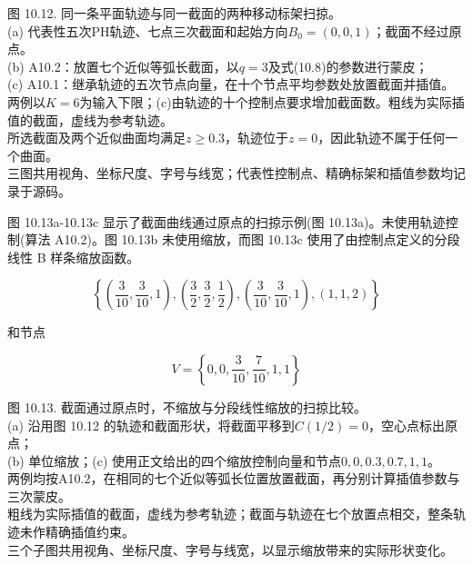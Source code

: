 \documentclass[../main.tex]{subfiles}
\begin{document}
\begin{center}
\begin{minipage}{35cm}
\vspace*{.6\baselineskip}
\centering
{}\par\vspace{.5cm}
\par\smallskip
图 10.12. 同一条平面轨迹与同一截面的两种移动标架扫掠。\\
(a) 代表性五次PH轨迹、七点三次截面和起始方向$B_0=(0,0,1)$；截面不经过原点。\\
(b) A10.2：放置七个近似等弧长截面，以$q=3$及式(10.8)的参数进行蒙皮；\\
(c) A10.1：继承轨迹的五次节点向量，在十个节点平均参数处放置截面并插值。\\
两例以$K=6$为输入下限；(c)由轨迹的十个控制点要求增加截面数。粗线为实际插值的截面，虚线为参考轨迹。\\
所选截面及两个近似曲面均满足$z\geq0.3$，轨迹位于$z=0$，因此轨迹不属于任何一个曲面。\\
三图共用视角、坐标尺度、字号与线宽；代表性控制点、精确标架和插值参数均记录于源码。
\end{minipage}
\end{center}

图 10.13a-10.13c 显示了截面曲线通过原点的扫掠示例(图 10.13a)。未使用轨迹控制(算法 A10.2)。图 10.13b 未使用缩放，而图 10.13c 使用了由控制点定义的分段线性 B 样条缩放函数。

\[
\left\{  {\left( {\frac{3}{10},\frac{3}{10},1}\right) ,\left( {\frac{3}{2},\frac{3}{2},\frac{1}{2}}\right) ,\left( {\frac{3}{10},\frac{3}{10},1}\right) ,\left( {1,1,2}\right) }\right\}
\]





和节点

\[
V = \left\{  {0,0,\frac{3}{10},\frac{7}{10},1,1}\right\}
\]

\begin{center}
\begin{minipage}{37cm}
\vspace*{.6\baselineskip}
\centering
{}\par\vspace{.5cm}
\par\smallskip
图 10.13. 截面通过原点时，不缩放与分段线性缩放的扫掠比较。\\
(a) 沿用图 10.12 的轨迹和截面形状，将截面平移到$C(1/2)=0$，空心点标出原点；\\
(b) 单位缩放；(c) 使用正文给出的四个缩放控制向量和节点$0,0,0.3,0.7,1,1$。\\
两例均按A10.2，在相同的七个近似等弧长位置放置截面，再分别计算插值参数与三次蒙皮。\\
粗线为实际插值的截面，虚线为参考轨迹；截面与轨迹在七个放置点相交，整条轨迹未作精确插值约束。\\
三个子图共用视角、坐标尺度、字号与线宽，以显示缩放带来的实际形状变化。
\end{minipage}
\end{center}
\end{document}
